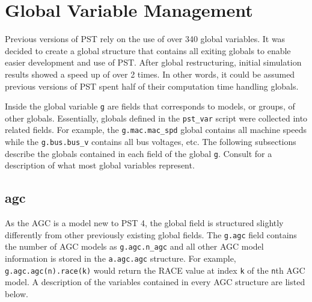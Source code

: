 \pagebreak
\section{Global Variable Management}  
Previous versions of PST rely on the use of over 340 global variables.
It was decided to create a global structure that contains all exiting globals to enable easier development and use of PST.
After global restructuring, initial simulation results showed a speed up of over 2 times.
In other words, it could be assumed previous versions of PST spent half of their computation time handling globals.


Inside the global variable \verb|g| are fields that corresponds to models, or groups, of other globals.
Essentially, globals defined in the \verb|pst_var| script were collected into related fields.
For example, the \verb|g.mac.mac_spd| global contains all machine speeds while the \verb|g.bus.bus_v| contains all bus voltages, etc.
The following subsections describe the globals contained in each field of the global \verb|g|. 
Consult \cite{PST3manual} for a description of what most global variables represent.


\subsection{agc}  
As the AGC is a model new to PST 4, the global field is structured slightly differently from other previously existing global fields.
The \verb|g.agc| field contains the number of AGC models as \verb|g.agc.n_agc| and all other AGC model information is stored in the \verb|a.agc.agc| structure.
For example, \verb|g.agc.agc(n).race(k)| would return the RACE value at index \verb|k| of the \verb|n|th AGC model.
A description of the variables contained in every AGC structure are listed below.

